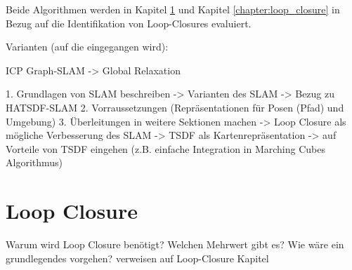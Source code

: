 Beide Algorithmen werden in Kapitel \ref{section:loop_closure_basics} und Kapitel \ref{chapter:loop_closure} in Bezug auf die Identifikation von Loop-Closures evaluiert.


Varianten (auf die eingegangen wird): 

ICP
Graph-SLAM -> Global Relaxation


 

1. Grundlagen von SLAM beschreiben
-> Varianten des SLAM
-> Bezug zu HATSDF-SLAM
2. Vorraussetzungen (Repräsentationen für Posen (Pfad) und Umgebung)
3. Überleitungen in weitere Sektionen machen
	-> Loop Closure als mögliche Verbesserung des SLAM
	-> TSDF als Kartenrepräsentation
		-> auf Vorteile von TSDF eingehen (z.B. einfache Integration in Marching Cubes Algorithmus)



\section{Loop Closure}
\label{section:loop_closure_basics}

Warum wird Loop Closure benötigt?
Welchen Mehrwert gibt es?
Wie wäre ein grundlegendes vorgehen?
verweisen auf Loop-Closure Kapitel